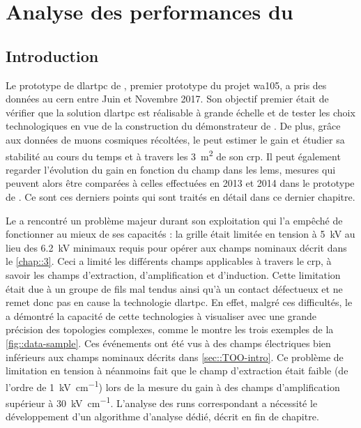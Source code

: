 \chapter{Analyse des performances du \texorpdfstring{\TOO{}}{3x1x1\;m3}}\label{chap::5}
    
  \section{Introduction}
    Le prototype de \gls{dlartpc} de \TOO{}, premier prototype du projet \gls{wa105}, a pris des données au \gls{cern} entre Juin et Novembre 2017. Son objectif premier était de vérifier que la solution \gls{dlartpc} est réalisable à grande échelle et de tester les choix technologiques en vue de la construction du démonstrateur de \SSS{}. De plus, grâce aux données de muons cosmiques récoltées, le \TOO{} peut estimer le gain et étudier sa stabilité au cours du temps et à travers les \SI{3}{\meter\squared} de son \gls{crp}. Il peut également regarder l'évolution du gain en fonction du champ dans les \glspl{lem}, mesures qui peuvent alors être comparées à celles effectuées en 2013 et 2014 dans le prototype de \threeL{}\cite{Cantini2014}. Ce sont ces derniers points qui sont traités en détail dans ce dernier chapitre.

    Le \TOO{} a rencontré un problème majeur durant son exploitation qui l'a empêché de fonctionner au mieux de ses capacités : la grille était limitée en tension à \SI{5}{\kilo\volt} au lieu des \SI{6.2}{\kilo\volt} minimaux requis pour opérer aux champs nominaux décrit dans le \autoref{chap::3}. Ceci a limité les différents champs applicables à travers le \gls{crp}, à savoir les champs d'extraction, d'amplification et d'induction. Cette limitation était due à un groupe de fils mal tendus ainsi qu'à un contact défectueux et ne remet donc pas en cause la technologie \gls{dlartpc}. En effet, malgré ces difficultés, le \TOO{} a démontré la capacité de cette technologies à visualiser avec une grande précision des topologies complexes, comme le montre les trois exemples de la \autoref{fig::data-sample}. Ces événements ont été vus à des champs électriques bien inférieurs aux champs nominaux décrits dans \autoref{sec::TOO-intro}. Ce problème de limitation en tension à néanmoins fait que le champ d'extraction était faible (de l'ordre de \SI{1}{\kilo\volt\per\centi\meter}) lors de la mesure du gain à des champs d'amplification supérieur à \SI{30}{\kilo\volt\per\centi\meter}. L'analyse des runs correspondant a nécessité le développement d'un algorithme d'analyse dédié, décrit en fin de chapitre.

